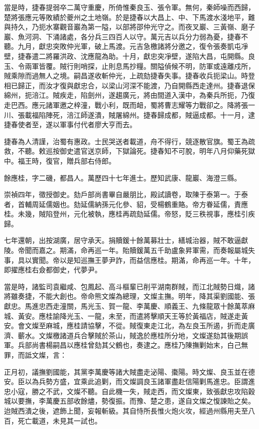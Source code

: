 \begin{pinyinscope}
當是時，捷春提弱卒二萬守重慶，所倚惟秦良玉、張令軍。無何，秦師噪而西歸，楚將張應元等敗績於夔州之土地嶺。於是捷春以大昌上、中、下馬渡水淺地平，難與持久，乃扼水寨觀音巖為第一隘，以部將邵仲光守之。而夜叉巖、三黃嶺、磨子巖、魚河洞、下涌諸處，各分兵三四百人以守。萬元吉以兵分力弱為憂，捷春不聽。九月，獻忠突敗仲光軍，破上馬渡。元吉急檄諸將分邀之，復令張奏凱屯凈壁，捷春遣二將羅洪政、沈應龍為助。十月，獻忠突凈壁，遂陷大昌，屯開縣。良玉、令兩軍皆覆。賊行則哨探，止則息馬抄糧。關隘偵候不明，防軍或遠離戍所，賊乘隙而過無人之境。嗣昌遂收斬仲光，上疏劾捷春失事。捷春收兵扼梁山。時登相已歸正，而汝才復與獻忠合，以梁山河深不能渡，乃自開縣西走達州。捷春退保綿州，扼涪江。賊疾走，陷劍州，遂趨廣元，將由間道入漢中，為秦兵所扼，乃復走巴西。應元諸軍邀之梓潼，戰小利，既而衄，蜀將曹志耀等力戰卻之。降將張一川、張載福陷陣死，涪江師遂潰，賊屠綿州。捷春歸成都，賊逼成都。十一月，逮捷春使者至，遂以軍事付代者廖大亨而去。

捷春為人清謹，治蜀有惠政。士民哭送者載道，舟不得行，競逐散官旗。蜀王為疏救，不聽。敕巡按御史遣官送京師，下獄論死。捷春知不可脫，明年八月仰藥死獄中。福王時，復官，贈兵部右侍郎。

餘應桂，字二磯，都昌人。萬歷四十七年進士。歷知武康、龍巖、海澄三縣。

崇禎四年，徵授御史。劾戶部尚書畢自嚴朋比，殿試讀卷，取陳于泰第一。于泰者，首輔周延儒姻也。劾延儒納孫元化參、貂，受楊鶴重賂。帝方眷延儒，責應桂。未幾，賊陷登州，元化被執，應桂再疏劾延儒。帝怒，貶三秩視事，應桂引疾歸。

七年還朝，出按湖廣，居守承天。捐贖鍰十餘萬募壯士，繕城治器，賊不敢逼獻陵。帝聞而嘉之。期滿，命再巡一年。貽贖鍰萬五千助盧象昇軍需，而奏報屬城失事，具以實聞。帝以是知巡撫王夢尹詐，而益信應桂。期滿，命再巡一年。十年，即擢應桂右僉都御史，代夢尹。

當是時，諸監司袁繼咸、包鳳起、高斗樞輩已削平湖南群賊，而江北賊勢日熾，諸將雖奏捷，不能大創也。帝命熊文燦為總理，文燦主撫。明年，降其渠劉國能、張獻忠。馬進忠西走潼關，馬光玉、賀一龍、李萬慶、順義王、九條龍眾十餘萬萃麻城、黃安。應桂諭降光玉、一龍，未至，而遣將擊順天王等於黃福店，賊遂走黃安。會文燦至麻城，應桂請協擊，不從。賊復東走江北，為左良玉所遏，折而走廣濟、蘄水。文燦檄諸道兵合擊賊於茶山，賊逸於應桂所分地，文燦遂劾其後期誤軍。兵部尚書楊嗣昌以應桂曾劾其父鶴也，奏逮之。應桂乃陳撫剿始末，白己無罪，而詆文燦，言：

正月初，議撫劉國能，其黨李萬慶等諸大賊盡走泌陽、棗陽。時文燦、良玉並在德安。臣以為兵勢方盛，宜乘此追剿，而文燦調良玉諸軍盡赴信陽剿馬進忠。臣謂進忠小寇，勝之不武，文燦不聽。自此機一失，賊走西，而文燦東，致張獻忠攻陷穀城以要撫，李萬慶五部收餘燼，勢復振。而豫、楚之患，遂自文燦之愎諫貽之矣。迨賊西潰之後，遮飾上聞，妄報斬級。其自恃所長惟火炮火攻，經過州縣用夫至八百，死亡載道，未見其一試也。


\end{pinyinscope}
